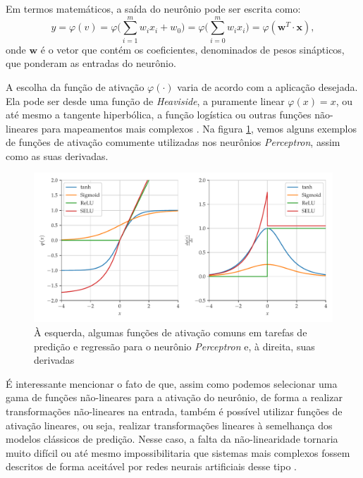 \documentclass[a4paper, 12pt]{article}
\begin{document}
Em termos matemáticos, a saída do neurônio pode ser escrita como:
\begin{equation}\label{eq:mlp-out}
y = \varphi(v) = \varphi  \Big(\sum_{i=1}^{m}w_i x_i + w_0 \Big) = \varphi \Big(\sum_{i=0}^{m}w_i x_i \Big) = \varphi (\mathbf{w}^T \cdot \mathbf{x}),
\end{equation}
onde $\mathbf{w}$ é o vetor que contém os coeficientes, denominados de pesos sinápticos, que ponderam as entradas do neurônio. 

A escolha da função de ativação $\varphi (\cdot)$ varia de acordo com a aplicação desejada. Ela pode ser desde uma função de \textit{Heaviside}, a puramente linear $\varphi(x) = x$, ou até mesmo a tangente hiperbólica, a função logística ou outras funções não-lineares para mapeamentos mais complexos \cite{geron2019hands}. Na figura \ref{fig:mlp-activations}, vemos alguns exemplos de funções de ativação comumente utilizadas nos neurônios \textit{Perceptron}, assim como as suas derivadas. 

\begin{figure}[!ht]
	\centering
	\includegraphics[scale = 0.7]{mlp-activations.pdf}
	\caption{À esquerda, algumas funções de ativação comuns em tarefas de predição e regressão para o neurônio \textit{Perceptron} e, à direita, suas derivadas}
	\label{fig:mlp-activations}
\end{figure}

É interessante mencionar o fato de que, assim como podemos selecionar uma gama de funções não-lineares para a ativação do neurônio, de forma a realizar transformações não-lineares na entrada, também é possível utilizar funções de ativação lineares, ou seja, realizar transformações lineares à semelhança dos modelos clássicos de predição. Nesse caso, a falta da não-linearidade tornaria muito difícil ou até mesmo impossibilitaria que sistemas mais complexos fossem descritos de forma aceitável por redes neurais artificiais desse tipo \cite{hornik1989multilayer}.
\end{document}
